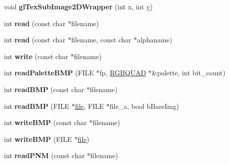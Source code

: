 \begin{DoxyCompactItemize}
\item 
\hypertarget{class_image_a4a3e8f3ca5aa6540ff67408966202c8e}{void {\bfseries gl\+Tex\+Sub\+Image2\+D\+Wrapper} (int x, int \hyperlink{_ice_utils_8h_aa7ffaed69623192258fb8679569ff9ba}{y})}\label{class_image_a4a3e8f3ca5aa6540ff67408966202c8e}

\item 
\hypertarget{class_image_a6981c966ae9c29bd42e6a56855ef9dd7}{int {\bfseries read} (const char $\ast$filename)}\label{class_image_a6981c966ae9c29bd42e6a56855ef9dd7}

\item 
\hypertarget{class_image_a867f786b6bd5479d5090a8cc93df0abe}{int {\bfseries read} (const char $\ast$filename, const char $\ast$alphaname)}\label{class_image_a867f786b6bd5479d5090a8cc93df0abe}

\item 
\hypertarget{class_image_a3594d16c81ed43e10d7d6640ad31fa17}{int {\bfseries write} (const char $\ast$filename)}\label{class_image_a3594d16c81ed43e10d7d6640ad31fa17}

\item 
\hypertarget{class_image_ad48372726f0de41af8218a54952aff8c}{int {\bfseries read\+Palette\+B\+M\+P} (F\+I\+L\+E $\ast$fp, \hyperlink{struct_r_g_b_q_u_a_d}{R\+G\+B\+Q\+U\+A\+D} $\ast$\&palette, int bit\+\_\+count)}\label{class_image_ad48372726f0de41af8218a54952aff8c}

\item 
\hypertarget{class_image_a700fed9e67778e4f9ff970c9b89fe8ac}{int {\bfseries read\+B\+M\+P} (const char $\ast$filename)}\label{class_image_a700fed9e67778e4f9ff970c9b89fe8ac}

\item 
\hypertarget{class_image_a14d2da9ff4c4251150854ecc7575a716}{int {\bfseries read\+B\+M\+P} (F\+I\+L\+E $\ast$\hyperlink{structfile}{file}, F\+I\+L\+E $\ast$file\+\_\+a, bool b\+Base\+Img)}\label{class_image_a14d2da9ff4c4251150854ecc7575a716}

\item 
\hypertarget{class_image_a38cc55ab27b9d316216abadb902afd89}{int {\bfseries write\+B\+M\+P} (const char $\ast$filename)}\label{class_image_a38cc55ab27b9d316216abadb902afd89}

\item 
\hypertarget{class_image_ac830ea296ba4c01df041bab58495c0ce}{int {\bfseries write\+B\+M\+P} (F\+I\+L\+E $\ast$\hyperlink{structfile}{file})}\label{class_image_ac830ea296ba4c01df041bab58495c0ce}

\item 
\hypertarget{class_image_a4f2cdbf8975e58cc0fa75519782c6c4d}{int {\bfseries read\+P\+N\+M} (const char $\ast$filename)}\label{class_image_a4f2cdbf8975e58cc0fa75519782c6c4d}


\end{DoxyCompactItemize}
